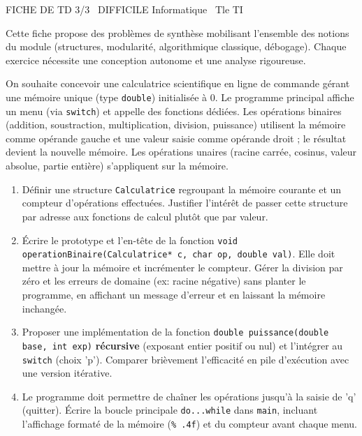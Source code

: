 \documentclass[11pt]{article}
\begin{document}
\begin{tcolorbox}[enhanced,colback=popink,colframe=popink,arc=10pt,boxrule=0pt,left=12pt,right=12pt,top=9pt,bottom=9pt]
{\color{white}\popxbold\small FICHE DE TD 3/3 \textbullet\ DIFFICILE \hfill Informatique \textbullet\ Tle TI\par}
\end{tcolorbox}
\vspace{4pt}
Cette fiche propose des problèmes de synthèse mobilisant l'ensemble des notions du module (structures, modularité, algorithmique classique, débogage). Chaque exercice nécessite une conception autonome et une analyse rigoureuse.

\begin{exercice}
On souhaite concevoir une calculatrice scientifique en ligne de commande gérant une mémoire unique (type \texttt{double}) initialisée à 0. Le programme principal affiche un menu (via \texttt{switch}) et appelle des fonctions dédiées. Les opérations binaires (addition, soustraction, multiplication, division, puissance) utilisent la mémoire comme opérande gauche et une valeur saisie comme opérande droit ; le résultat devient la nouvelle mémoire. Les opérations unaires (racine carrée, cosinus, valeur absolue, partie entière) s'appliquent sur la mémoire.
\begin{enumerate}
    \item Définir une structure \texttt{Calculatrice} regroupant la mémoire courante et un compteur d'opérations effectuées. Justifier l'intérêt de passer cette structure par adresse aux fonctions de calcul plutôt que par valeur.
    \item Écrire le prototype et l'en-tête de la fonction \texttt{void operationBinaire(Calculatrice* c, char op, double val)}. Elle doit mettre à jour la mémoire et incrémenter le compteur. Gérer la division par zéro et les erreurs de domaine (ex: racine négative) sans planter le programme, en affichant un message d'erreur et en laissant la mémoire inchangée.
    \item Proposer une implémentation de la fonction \texttt{double puissance(double base, int exp)} \textbf{récursive} (exposant entier positif ou nul) et l'intégrer au \texttt{switch} (choix 'p'). Comparer brièvement l'efficacité en pile d'exécution avec une version itérative.
    \item Le programme doit permettre de chaîner les opérations jusqu'à la saisie de 'q' (quitter). Écrire la boucle principale \texttt{do...while} dans \texttt{main}, incluant l'affichage formaté de la mémoire (\texttt{\% .4f}) et du compteur avant chaque menu.
\end{enumerate}
\end{exercice}
\end{document}
